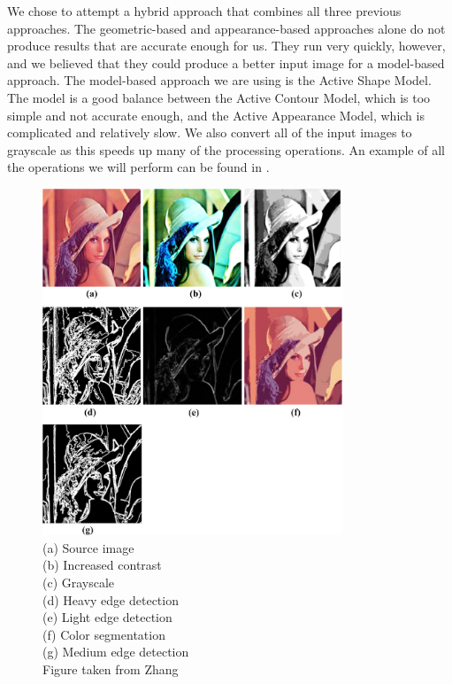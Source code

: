 We chose to attempt a hybrid approach that combines all three previous approaches. The geometric-based and appearance-based approaches alone do not produce results that are accurate enough for us. They run very quickly, however, and we believed that they could produce a better input image for a model-based approach. The model-based approach we are using is the Active Shape Model. The model is a good balance between the Active Contour Model, which is too simple and not accurate enough, and the Active Appearance Model, which is complicated and relatively slow. We also convert all of the input images to grayscale as this speeds up many of the processing operations. An example of all the operations we will perform can be found in .

\begin{figure}[p]
    \centering
    \includegraphics[width=0.8\textwidth]{diagrams/lena.png}
    \caption[Image filters]{(a) Source image\\(b) Increased contrast\\(c) Grayscale\\(d) Heavy edge detection\\
	(e) Light edge detection\\(f) Color segmentation\\(g) Medium edge detection\\Figure taken from Zhang\cite{filters}}
    \label{fig:lena}
\end{figure}